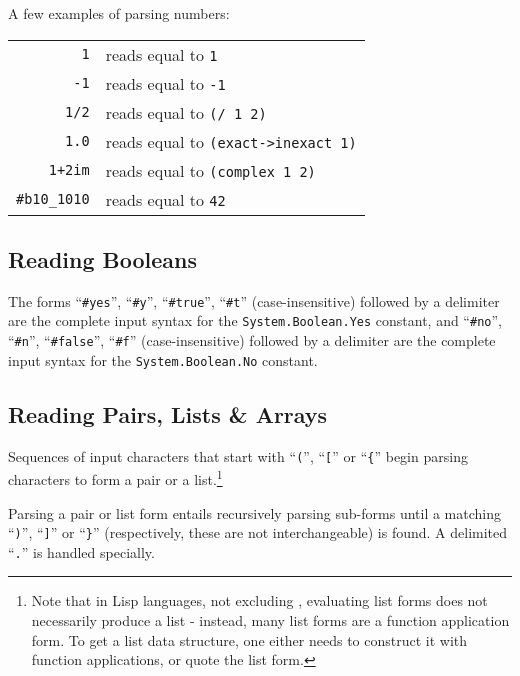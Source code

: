 \example A few examples of parsing numbers:

\begin{tabular}{ r l }
  \lstinline!1! & reads equal to \lstinline!1! \\
  \lstinline!-1! & reads equal to \lstinline!-1! \\
  \lstinline!1/2! & reads equal to \lstinline!(/ 1 2)! \\
  \lstinline!1.0! & reads equal to \lstinline!(exact->inexact 1)! \\
  \lstinline!1+2im! & reads equal to \lstinline!(complex 1 2)! \\
  \lstinline!#b10_1010! & reads equal to \lstinline!42! \\
\end{tabular}






\subsection{Reading Booleans}
\label{subsec:aml-base-lang-reader-booleans}

The forms ``\lstinline!#yes!'', ``\lstinline!#y!'', ``\lstinline!#true!'', ``\lstinline!#t!'' (case-insensitive) followed by a delimiter are the complete input syntax for the \lstinline!System.Boolean.Yes! constant, and ``\lstinline!#no!'', ``\lstinline!#n!'', ``\lstinline!#false!'', ``\lstinline!#f!'' (case-insensitive) followed by a delimiter are the complete input syntax for the \lstinline!System.Boolean.No! constant.





\subsection{Reading Pairs, Lists \& Arrays}
\label{subsec:aml-base-lang-reader-lists}

Sequences of input characters that start with ``\lstinline!(!'', ``\lstinline![!'' or ``\lstinline!{!'' begin parsing characters to form a pair or a list.\footnote{Note that in Lisp languages, not excluding \AmlBase, evaluating list forms does not necessarily produce a list - instead, many list forms are a function application form. To get a list data structure, one either needs to construct it with function applications, or quote the list form.}

Parsing a pair or list form entails recursively parsing sub-forms until a matching ``\lstinline!)!'', ``\lstinline!]!'' or ``\lstinline!}!'' (respectively, these are not interchangeable) is found. A delimited ``\lstinline!.!'' is handled specially.


